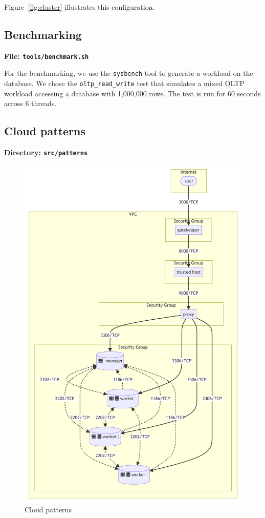 \documentclass[letterpaper,headings=standardclasses,parskip=half]{scrartcl}
\begin{document}
Figure~\ref{fig:cluster} illustrates this configuration.

\subsection{Benchmarking}

\textbf{File: \texttt{tools/benchmark.sh}}

For the benchmarking, we use the \texttt{sysbench} tool to generate a workload on the database. We chose the \texttt{oltp\_read\_write} test that simulates a mixed OLTP workload accessing a database with 1,000,000 rows. The test is run for 60 seconds across 6 threads.

\subsection{Cloud patterns}

\textbf{Directory: \texttt{src/patterns}}

\begin{figure}[h]
    \centering
    \includegraphics[width=0.75\linewidth]{figures/patterns.mmd.pdf}
    \caption{Cloud patterns}
    \label{fig:patterns}
\end{figure}
\end{document}
